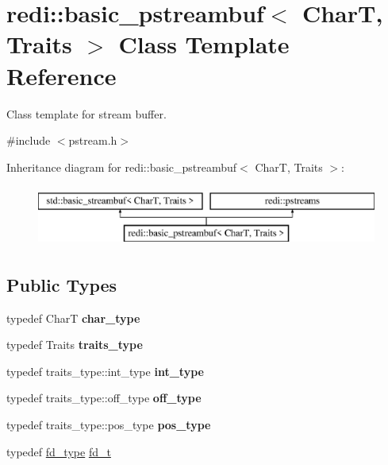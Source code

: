 \hypertarget{classredi_1_1basic__pstreambuf}{}\section{redi\+:\+:basic\+\_\+pstreambuf$<$ CharT, Traits $>$ Class Template Reference}
\label{classredi_1_1basic__pstreambuf}


Class template for stream buffer.  




{\ttfamily \#include $<$pstream.\+h$>$}

Inheritance diagram for redi\+:\+:basic\+\_\+pstreambuf$<$ CharT, Traits $>$\+:\begin{figure}[H]
\begin{center}
\leavevmode
\includegraphics[height=2.000000cm]{classredi_1_1basic__pstreambuf}
\end{center}
\end{figure}
\subsection*{Public Types}
\begin{DoxyCompactItemize}
\item 
\mbox{\label{classredi_1_1basic__pstreambuf_a258ffd4e02fed4feb893ffccde0c7204}} 
typedef CharT {\bfseries char\+\_\+type}
\item 
\mbox{\label{classredi_1_1basic__pstreambuf_a6889e5a67fc1c802ff355f9c53dd7f58}} 
typedef Traits {\bfseries traits\+\_\+type}
\item 
\mbox{\label{classredi_1_1basic__pstreambuf_a7468fdfa386d544276fd440dbd0d77b6}} 
typedef traits\+\_\+type\+::int\+\_\+type {\bfseries int\+\_\+type}
\item 
\mbox{\label{classredi_1_1basic__pstreambuf_accba880c0c8c12b53677d9b64d86621b}} 
typedef traits\+\_\+type\+::off\+\_\+type {\bfseries off\+\_\+type}
\item 
\mbox{\label{classredi_1_1basic__pstreambuf_a1b655544c17c59ebb4af84e911400da0}} 
typedef traits\+\_\+type\+::pos\+\_\+type {\bfseries pos\+\_\+type}
\item 
typedef \mbox{\hyperlink{structredi_1_1pstreams_add0b7eaed16eb6c22a56012958d85b1d}{fd\+\_\+type}} \mbox{\hyperlink{classredi_1_1basic__pstreambuf_aaa33e67df3b5330b2d29f8ceca3d9a15}{fd\+\_\+t}}
\end{DoxyCompactItemize}
